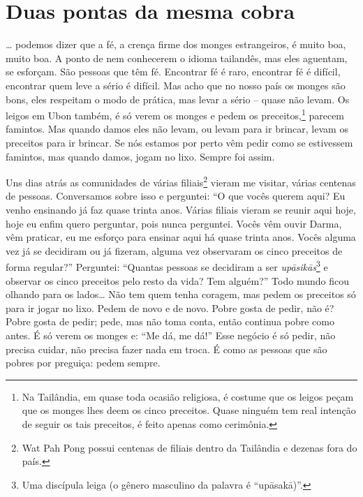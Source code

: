 
\chapter{Duas pontas da mesma cobra}
\markright{\theChapterAuthor}

\ldots{} podemos dizer que a fé, a crença firme dos monges estrangeiros, é
muito boa, muito boa. A ponto de nem conhecerem o idioma tailandês, mas
eles aguentam, se esforçam. São pessoas que têm fé. Encontrar fé é
raro, encontrar fé é difícil, encontrar quem leve a sério é difícil.
Mas acho que no nosso país os monges são bons, eles respeitam o modo de
prática, mas levar a sério – quase não levam. Os
leigos em Ubon também, é só verem os monges e pedem os
preceitos,\footnote{Na Tailândia, em quase toda ocasião religiosa, é
costume que os leigos peçam que os monges lhes deem os cinco preceitos.
Quase ninguém tem real intenção de seguir os tais preceitos, é feito
apenas como cerimônia.} parecem famintos. Mas quando damos eles não
levam, ou levam para ir brincar, levam os preceitos para ir brincar. Se
nós estamos por perto vêm pedir como se estivessem famintos, mas quando
damos, jogam no lixo. Sempre foi assim. 

Uns dias atrás as comunidades de várias filiais\footnote{Wat Pah
Pong possui centenas de filiais dentro da Tailândia e dezenas fora do
país.} vieram me visitar, várias centenas de pessoas. Conversamos sobre
isso e perguntei: “O que vocês querem aqui? Eu venho ensinando já faz
quase trinta anos. Várias filiais vieram se reunir aqui hoje, hoje eu
enfim quero perguntar, pois nunca perguntei. Vocês vêm ouvir Darma, vêm
praticar, eu me esforço para ensinar aqui há quase trinta anos. Vocês
alguma vez já se decidiram ou já fizeram, alguma vez observaram os
cinco preceitos de forma regular?” Perguntei: “Quantas pessoas se
decidiram a ser \textit{upāsikās}\footnote{Uma discípula leiga (o
gênero masculino da palavra é “upāsakā)”.} e observar os
cinco preceitos pelo resto da vida? Tem alguém?” Todo mundo ficou
olhando para os lados\ldots{} Não tem quem tenha coragem, mas pedem os
preceitos só para ir jogar no lixo. Pedem de novo e de novo. Pobre
gosta de pedir, não é? Pobre gosta de pedir; pede, mas não toma conta,
então continua pobre como antes. É só verem os monges e: “Me dá, me
dá!” Esse negócio é só pedir, não precisa cuidar, não precisa fazer
nada em troca. É como as pessoas que são pobres por
preguiça: pedem sempre. 


